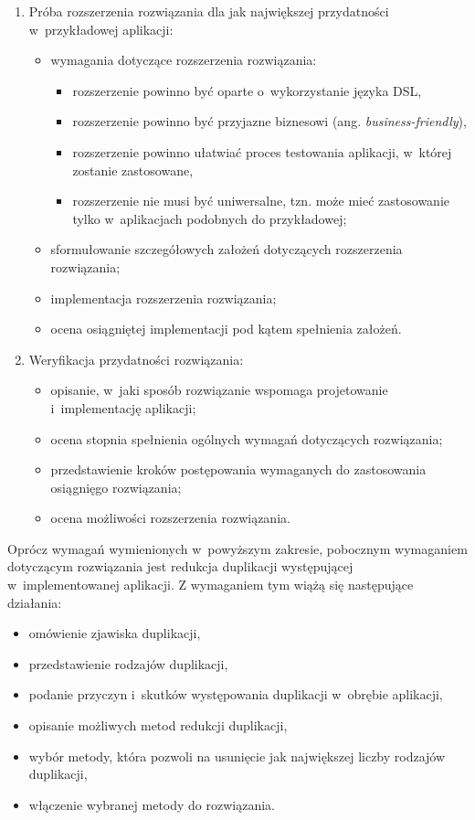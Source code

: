 \begin{enumerate}
 \item Próba rozszerzenia rozwiązania dla jak największej przydatności w~przykładowej aplikacji:
  \begin{itemize}
   \item wymagania dotyczące rozszerzenia rozwiązania:
    \begin{itemize}
     \item rozszerzenie powinno być oparte o~wykorzystanie języka DSL,
     \item rozszerzenie powinno być przyjazne biznesowi (ang. \emph{business-friendly}),
     \item rozszerzenie powinno ułatwiać proces testowania aplikacji, w~której zostanie zastosowane,
     \item rozszerzenie nie musi być uniwersalne, tzn. może mieć zastosowanie tylko w~aplikacjach podobnych do przykładowej;
    \end{itemize}
   \item sformułowanie szczegółowych założeń dotyczących rozszerzenia rozwiązania;
   \item implementacja rozszerzenia rozwiązania;
   \item ocena osiągniętej implementacji pod kątem spełnienia założeń.
  \end{itemize}
 
 \item Weryfikacja przydatności rozwiązania:
  \begin{itemize}
   \item opisanie, w~jaki sposób rozwiązanie wspomaga projetowanie i~implementację aplikacji;
   \item ocena stopnia spełnienia ogólnych wymagań dotyczących rozwiązania;
   \item przedstawienie kroków postępowania wymaganych do zastosowania osiągnięgo rozwiązania;
   \item ocena możliwości rozszerzenia rozwiązania.
  \end{itemize}

\end{enumerate}

Oprócz wymagań wymienionych w~powyższym zakresie, pobocznym wymaganiem dotyczącym rozwiązania jest redukcja duplikacji występującej w~implementowanej aplikacji.
Z wymaganiem tym wiążą się następujące działania:

\begin{itemize}
 \item omówienie zjawiska duplikacji,
 \item przedstawienie rodzajów duplikacji,
 \item podanie przyczyn i~skutków występowania duplikacji w~obrębie aplikacji,
 \item opisanie możliwych metod redukcji duplikacji,
 \item wybór metody, która pozwoli na usunięcie jak największej liczby rodzajów duplikacji,
 \item włączenie wybranej metody do rozwiązania.
\end{itemize}



